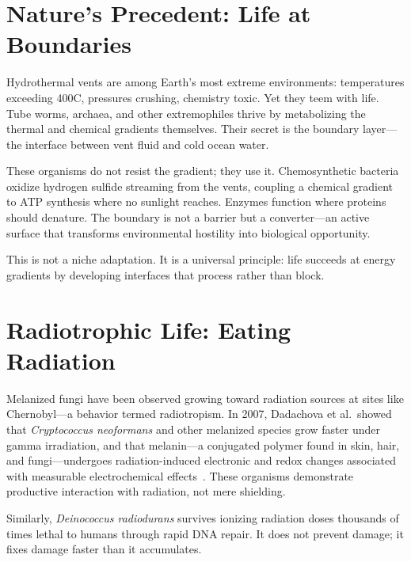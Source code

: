 \documentclass[12pt]{article}
\begin{document}
\section{Nature's Precedent: Life at Boundaries}

Hydrothermal vents are among Earth's most extreme environments: temperatures exceeding
400\textdegree C, pressures crushing, chemistry toxic. Yet they teem with life. Tube
worms, archaea, and other extremophiles thrive by metabolizing the thermal and chemical
gradients themselves. Their secret is the boundary layer---the interface between vent
fluid and cold ocean water.

These organisms do not resist the gradient; they use it. Chemosynthetic bacteria oxidize
hydrogen sulfide streaming from the vents, coupling a chemical gradient to ATP synthesis
where no sunlight reaches. Enzymes function where proteins should denature. The boundary
is not a barrier but a converter---an active surface that transforms environmental
hostility into biological opportunity.

This is not a niche adaptation. It is a universal principle: life succeeds at energy
gradients by developing interfaces that process rather than block.

\section{Radiotrophic Life: Eating Radiation}

Melanized fungi have been observed growing toward radiation sources at sites like
Chernobyl---a behavior termed radiotropism. In 2007, Dadachova et al.\ showed that
\textit{Cryptococcus neoformans} and other melanized species grow faster under gamma
irradiation, and that melanin---a conjugated polymer found in skin, hair, and
fungi---undergoes radiation-induced electronic and redox changes associated with
measurable electrochemical effects~\cite{dadachova2007,turick2011}. These organisms
demonstrate productive interaction with radiation, not mere shielding.

Similarly, \textit{Deinococcus radiodurans} survives ionizing radiation doses thousands
of times lethal to humans through rapid DNA repair. It does not prevent damage; it fixes
damage faster than it accumulates.
\end{document}
